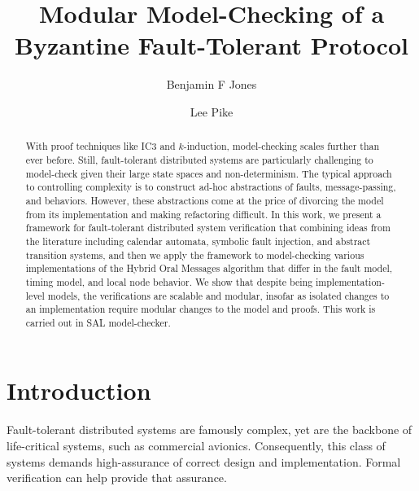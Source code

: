 \documentclass{llncs/llncs}
\begin{document}
\title{Modular Model-Checking of a Byzantine Fault-Tolerant Protocol}

\author{Benjamin F Jones \and Lee Pike}


\maketitle

\begin{abstract}
With proof techniques like IC3 and $k$-induction, model-checking scales further
than ever before.  Still, fault-tolerant distributed systems are particularly
challenging to model-check given their large state spaces and
non-determinism. The typical approach to controlling complexity is to construct
ad-hoc abstractions of faults, message-passing, and behaviors.  However, these
abstractions come at the price of divorcing the model from its implementation
and making refactoring difficult. In this work, we present a framework for
fault-tolerant distributed system verification that combining ideas from the literature including calendar automata,
symbolic fault injection, and abstract transition systems, and then we apply the framework to model-checking various implementations of the Hybrid Oral Messages algorithm that differ in the fault model, timing model, and local node behavior. We show that despite being implementation-level models, the verifications are scalable and modular, insofar as isolated changes to an implementation require modular changes to the model and proofs.
This work is carried out in SAL model-checker.
\end{abstract}

\section{Introduction}

Fault-tolerant distributed systems are famously complex, yet are the backbone of life-critical systems, such as commercial avionics. Consequently, this class of systems demands high-assurance of correct design and implementation. Formal verification can help provide that assurance.
\end{document}
